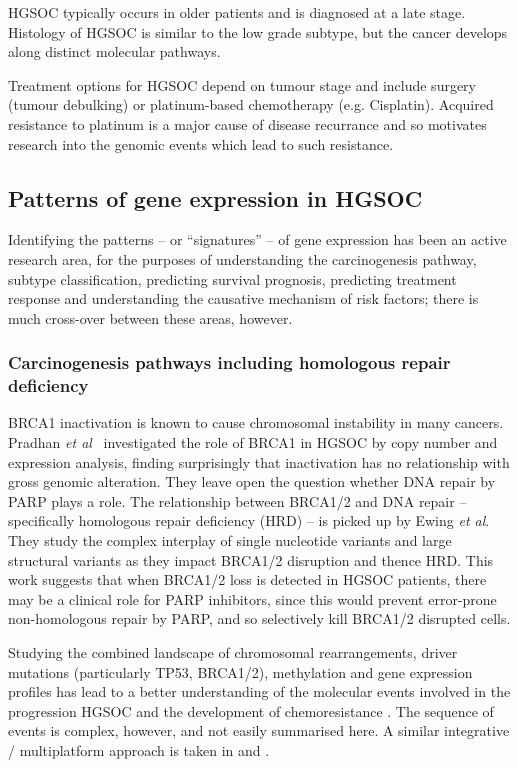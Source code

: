 \documentclass[draft, tikz, 12pt,a4paper,oneside,fleqn]{article}
\newcommand{\etal}{{\em et al\/}}
\begin{document}
HGSOC typically occurs in older patients and is diagnosed at a late stage.   Histology of HGSOC is similar to the low grade subtype, but the cancer develops along distinct molecular pathways. 

Treatment options for HGSOC depend on tumour stage and include surgery (tumour debulking) or platinum-based chemotherapy (e.g. Cisplatin).  Acquired resistance to platinum is a major cause of disease recurrance\cite{Patch2015} and so motivates research into the genomic events which lead to such resistance.


\subsection{Patterns of gene expression in HGSOC}

Identifying the patterns -- or ``signatures'' -- of gene expression has been an active research area, for the purposes of understanding the carcinogenesis pathway, subtype classification, predicting survival prognosis, predicting treatment response and understanding the causative mechanism of risk factors; there is much cross-over between these areas, however.

\subsubsection{Carcinogenesis pathways including homologous repair deficiency
}


BRCA1 inactivation is known to cause chromosomal instability in many cancers.  Pradhan \etal\ \cite{Pradhan2010} investigated the role of BRCA1 in HGSOC by copy number and expression analysis, finding surprisingly that inactivation has no relationship with gross genomic alteration.  They leave open the question whether DNA repair by PARP plays a role.   The relationship between BRCA1/2 and DNA repair -- specifically homologous repair deficiency (HRD) -- is picked up by Ewing \etal \cite{Ewing2020}.  They study the complex interplay of single nucleotide variants and large structural variants as they impact BRCA1/2 disruption and thence HRD.  This work suggests that when BRCA1/2 loss is detected in HGSOC patients, there may be a clinical role for PARP inhibitors, since this would prevent error-prone non-homologous repair by PARP, and so selectively kill BRCA1/2 disrupted cells.

Studying the combined landscape of chromosomal rearrangements, driver mutations (particularly TP53, BRCA1/2), methylation and gene expression profiles has lead to a better understanding of the molecular events involved in the progression HGSOC and the development of chemoresistance \cite{Patch2015}.  The sequence of events is complex, however, and not easily summarised here.   A similar integrative / multiplatform approach is taken in \cite{He2017a} and \cite{Hoadley2014}.
\end{document}
